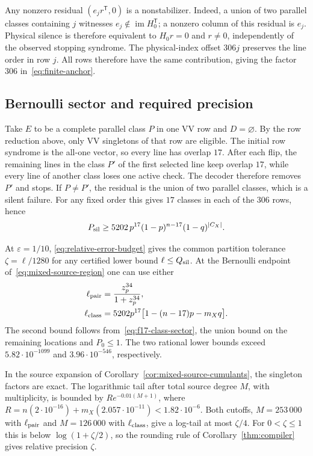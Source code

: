 \documentclass[10pt,twocolumn]{article}
\theoremstyle{definition}
\DeclareMathOperator{\im}{im}
\begin{document}
Any nonzero residual $(e_jr^{\mathsf T},0)$ is a nonstabilizer.
Indeed, a union of two parallel classes containing $j$ witnesses
$e_j\notin\im H_0^{\mathsf T}$; a nonzero column of this residual is
$e_j$. Physical silence is therefore equivalent to
$H_0r=0$ and $r\ne0$, independently of the observed stopping syndrome.
The physical-index offset $306j$ preserves the line order in row $j$.
All rows therefore have the same contribution, giving the factor $306$
in~\eqref{eq:finite-anchor}.

\subsection{Bernoulli sector and required precision}\label{app:f17-orders}
Take $E$ to be a complete parallel class $P$ in one VV row and
$D=\varnothing$. By the row reduction above, only VV singletons of
that row are eligible. The initial row syndrome is the all-one vector,
so every line has overlap $17$. After each flip, the
remaining lines in the class $P'$ of the first selected line keep
overlap $17$, while every line of another class loses one active check.
The decoder therefore removes $P'$ and stops. If $P\ne P'$, the residual
is the union of two parallel classes, which is a silent failure. For
any fixed order this gives $17$ classes in each of the $306$ rows, hence
\begin{equation}\label{eq:f17-class-sector}
 P_{\rm sil}\ge5202\,p^{17}(1-p)^{n-17}(1-q)^{|C_X|}.
\end{equation}

At $\varepsilon=1/10$, \eqref{eq:relative-error-budget} gives the
common partition tolerance $\zeta=\ell/1280$ for any certified lower
bound $\ell\le Q_{\rm sil}$. At the Bernoulli endpoint
of~\eqref{eq:mixed-source-region} one can use either
\[
\begin{aligned}
 \ell_{\rm pair}&=\frac{z_p^{34}}{1+z_p^{34}},\\
 \ell_{\rm class}&=5202p^{17}\bigl[1-(n-17)p-m_Xq\bigr].
\end{aligned}
\]
The second bound follows from~\eqref{eq:f17-class-sector},
the union bound on the remaining locations and $P_0\le1$.
The two rational lower bounds exceed $5.82\cdot10^{-1099}$ and
$3.96\cdot10^{-546}$, respectively.

In the source expansion of Corollary~\ref{cor:mixed-source-cumulants},
the singleton factors are exact. The logarithmic tail after total
source degree $M$, with multiplicity, is bounded by $R e^{-0.01(M+1)}$,
where $R=n(2\cdot10^{-16})+m_X(2.057\cdot10^{-11})<1.82\cdot10^{-6}$.
Both cutoffs, $M=253\,000$ with $\ell_{\rm pair}$ and $M=126\,000$
with $\ell_{\rm class}$, give a log-tail at most $\zeta/4$.
For $0<\zeta\le1$ this is below $\log(1+\zeta/2)$, so the rounding
rule of Corollary~\ref{thm:compiler} gives relative precision $\zeta$.
\end{document}
